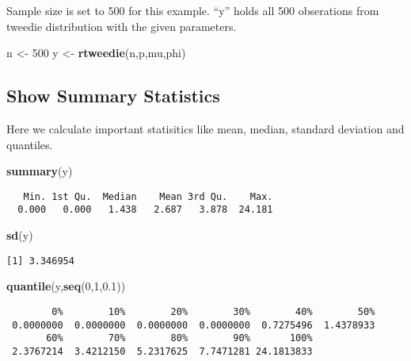 \documentclass[]{book}
\newenvironment{Shaded}{\begin{snugshade}}{\end{snugshade}}
\newcommand{\KeywordTok}[1]{\textcolor[rgb]{0.13,0.29,0.53}{\textbf{#1}}}
\newcommand{\DecValTok}[1]{\textcolor[rgb]{0.00,0.00,0.81}{#1}}
\newcommand{\FloatTok}[1]{\textcolor[rgb]{0.00,0.00,0.81}{#1}}
\newcommand{\StringTok}[1]{\textcolor[rgb]{0.31,0.60,0.02}{#1}}
\newcommand{\NormalTok}[1]{#1}
\theoremstyle{definition}
\theoremstyle{definition}
\theoremstyle{definition}
\theoremstyle{remark}
\begin{document}
Sample size is set to 500 for this example. ``y'' holds all 500
obserations from tweedie distribution with the given parameters.

\begin{Shaded}
\begin{Highlighting}[]
\NormalTok{n <-}\StringTok{ }\DecValTok{500}
\NormalTok{y <-}\StringTok{ }\KeywordTok{rtweedie}\NormalTok{(n,p,mu,phi)}
\end{Highlighting}
\end{Shaded}

\subsection{Show Summary Statistics}\label{show-summary-statistics}

Here we calculate important statisitics like mean, median, standard
deviation and quantiles.

\begin{Shaded}
\begin{Highlighting}[]
\KeywordTok{summary}\NormalTok{(y)}
\end{Highlighting}
\end{Shaded}

\begin{verbatim}
   Min. 1st Qu.  Median    Mean 3rd Qu.    Max. 
  0.000   0.000   1.438   2.687   3.878  24.181 
\end{verbatim}

\begin{Shaded}
\begin{Highlighting}[]
\KeywordTok{sd}\NormalTok{(y)}
\end{Highlighting}
\end{Shaded}

\begin{verbatim}
[1] 3.346954
\end{verbatim}

\begin{Shaded}
\begin{Highlighting}[]
\KeywordTok{quantile}\NormalTok{(y,}\KeywordTok{seq}\NormalTok{(}\DecValTok{0}\NormalTok{,}\DecValTok{1}\NormalTok{,}\FloatTok{0.1}\NormalTok{))}
\end{Highlighting}
\end{Shaded}

\begin{verbatim}
        0%        10%        20%        30%        40%        50% 
 0.0000000  0.0000000  0.0000000  0.0000000  0.7275496  1.4378933 
       60%        70%        80%        90%       100% 
 2.3767214  3.4212150  5.2317625  7.7471281 24.1813833 
\end{verbatim}
\end{document}
